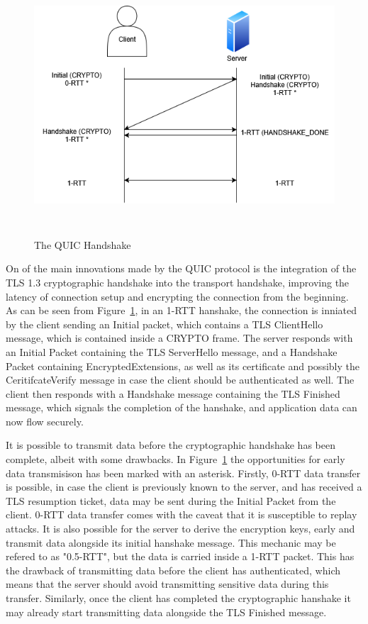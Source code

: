 \documentclass[english, 12pt, a4paper, elec, utf8, a-2b, online]{aaltothesis}
\begin{document}
\begin{figure}[h]
	\centering
	\includegraphics[alt={Diagram of QUIC handshake between a client and a server}, height=9cm]{./images/quic_handshake.png}
	\caption{The QUIC Handshake}
	\label{fig:quic_handshake}
\end{figure}

On of the main innovations made by the QUIC protocol is the integration of the
TLS 1.3 cryptographic handshake into the transport handshake, improving the latency
of connection setup and encrypting the connection from the beginning. As can be
seen from Figure~\ref{fig:quic_handshake}, in an 1-RTT hanshake, the connection is inniated by the client
sending an Initial packet, which contains a TLS ClientHello message, which is
contained inside a CRYPTO frame. The server responds with an Initial Packet containing
the TLS ServerHello message, and a Handshake Packet containing EncryptedExtensions, as
well as its certificate and possibly the CeritifcateVerify message in case the client
should be authenticated as well. The client then responds with a Handshake message
containing the TLS Finished message, which signals the completion of the hanshake,
and application data can now flow securely\cite{rfc9000, rfc9001}.

It is possible to transmit data before the cryptographic handshake has been complete,
albeit with some drawbacks. In Figure~\ref{fig:quic_handshake} the opportunities
for early data transmisison has been marked with an asterisk. Firstly, 0-RTT data
transfer is possible, in case the client is previously known to the server, and
has received a TLS resumption ticket, data may be sent during the Initial Packet
from the client. 0-RTT data transfer comes with the caveat that it is susceptible
to replay attacks. It is also possible for the server to derive the encryption keys,
early and transmit data alongside its initial hanshake message. This mechanic may
be refered to as "0.5-RTT", but the data is carried inside a 1-RTT packet. This has
the drawback of transmitting data before the client has authenticated, which means
that the server should avoid transmitting sensitive data during this transfer. Similarly,
once the client has completed the cryptographic hanshake it may already start
transmitting data alongside the TLS Finished message\cite{rfc9000, rfc9001}.
\end{document}
